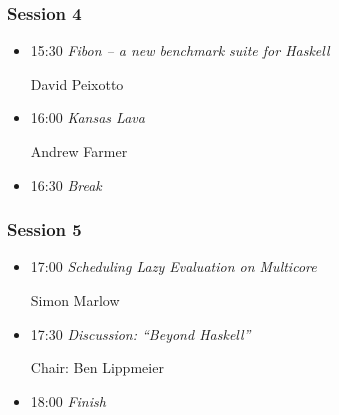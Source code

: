\documentclass{article}[10pt]
\newenvironment{tightItemize}{
\begin{itemize}
  \setlength{\itemsep}{1pt}
  \setlength{\parskip}{0pt}
  \setlength{\parsep}{0pt}}{\end{itemize}
}
\newcommand{\session}[1]{\subsubsection*{#1}}
\begin{document}
          \session{Session 4}

          \begin{tightItemize}
            \item[15:30]\textit{Fibon -- a new benchmark suite for Haskell}

              David Peixotto
            
            \item[16:00]\textit{Kansas Lava}

              Andrew Farmer

            \item[16:30] \textit{Break}
          \end{tightItemize}

          \session{Session 5}

          \begin{tightItemize}
            \item[17:00]\textit{Scheduling Lazy Evaluation on Multicore}

              Simon Marlow

            \item[17:30]\textit{Discussion: ``Beyond Haskell''}

              Chair: Ben Lippmeier

            \item[18:00]\textit{Finish}
          \end{tightItemize}

\end{document}

